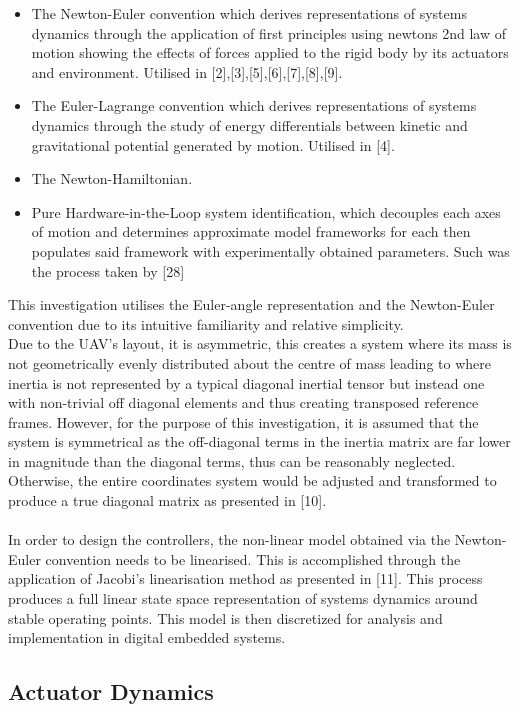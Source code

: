 \documentclass[12pt,a4paper,twoside]{report}
\begin{document}
				\begin{itemize}
					\item
						The Newton-Euler convention which derives representations of systems dynamics through the application of first principles using newtons 2nd law of motion showing the effects of forces applied to the rigid body by its actuators and environment. Utilised in [2],[3],[5],[6],[7],[8],[9].
					\item 
						The Euler-Lagrange convention which derives representations of systems dynamics through the study of energy differentials between kinetic and gravitational potential generated by motion. Utilised in [4]. 
					\item 
						The Newton-Hamiltonian.
					\item 
						Pure Hardware-in-the-Loop system identification, which decouples each axes of motion and determines approximate model frameworks for each then populates said framework with experimentally obtained parameters. Such was the process taken by [28]
				\end{itemize}
				\space
				This investigation utilises the Euler-angle representation and the Newton-Euler convention due to its intuitive familiarity and relative simplicity.
				\\
				Due to the UAV's layout, it is asymmetric, this creates a system where its mass is not geometrically evenly distributed about the centre of mass leading to where inertia is not represented by a typical diagonal inertial tensor but instead one with non-trivial off diagonal elements and thus creating transposed reference frames. However, for the purpose of this investigation, it is assumed that the system is symmetrical as the off-diagonal terms in the inertia matrix are far lower in magnitude than the diagonal terms, thus can be reasonably neglected. Otherwise, the entire coordinates system would be adjusted and transformed to produce a true diagonal matrix as presented in [10]. 
				\\ \\
				In order to design the controllers, the non-linear model obtained via the Newton-Euler convention needs to be linearised. This is accomplished through the application of Jacobi’s linearisation method as presented in [11]. This process produces a full linear state space representation of systems dynamics around stable operating points. This model is then discretized for analysis and implementation in digital embedded systems.
				
			\subsection{Actuator Dynamics}	
			
\end{document}

